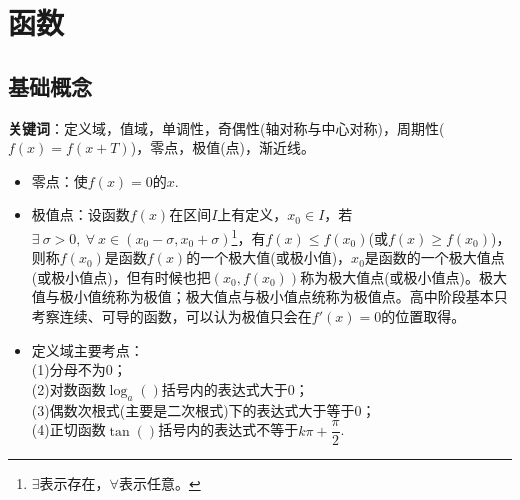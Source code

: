 \chapter{函数}

\section{基础概念}
\noindent \textbf{关键词}：定义域，值域，单调性，奇偶性(轴对称与中心对称)，周期性($ f(x)=f(x+T) $)，零点，极值(点)，渐近线。 

\begin{itemize}[leftmargin=\inteval{\myitemleftmargin}pt,itemsep=
   \inteval{\myitemitempsep}pt,topsep=\inteval{\myitemtopsep}pt]
\item 零点：使$ f(x)=0 $的$ x $. 
\item 极值点：设函数$ f(x) $在区间$ I $上有定义，$ x_0\in I $，若$ \exists\ \sigma>0,\ \forall\ x\in(x_0-\sigma,x_0+\sigma) $\footnote{$ \exists $表示存在，$ \forall $表示任意。}，有$ f(x)\leq f(x_0) $(或$ f(x)\geq f(x_0) $)，则称$ f(x_0) $是函数$ f(x) $的一个极大值(或极小值)，$ x_0 $是函数的一个极大值点(或极小值点)，但有时候也把$ (x_0,f(x_0)) $称为极大值点(或极小值点)。极大值与极小值统称为极值；极大值点与极小值点统称为极值点。高中阶段基本只考察连续、可导的函数，可以认为极值只会在$ f'(x)=0 $的位置取得。

\item 定义域主要考点：\\
(1)分母不为0；\\
(2)对数函数$ \log_a() $括号内的表达式大于0；\\
(3)偶数次根式(主要是二次根式)下的表达式大于等于0；\\
(4)正切函数$ \tan() $括号内的表达式不等于$ k\pi+\dfrac{\pi}{2} $. 

\end{itemize}

